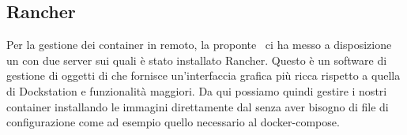         \subsection{Rancher}
    	Per la gestione dei container in remoto, la proponte \II~ci ha messo a disposizione un  con due server sui quali è stato installato Rancher. Questo è un software di gestione di oggetti di  che fornisce un'interfaccia grafica più ricca rispetto a quella di Dockstation e funzionalità maggiori.
    	Da qui possiamo quindi gestire i nostri container installando le immagini direttamente dal  senza aver bisogno di file di configurazione come ad esempio quello necessario al docker-compose.
        
			